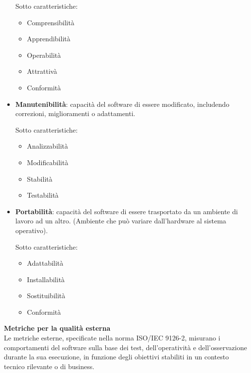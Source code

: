 \begin{itemize}
			Sotto caratteristiche:
			
			\begin{itemize}
			
				\item Comprensibilità
				\item Apprendibilità
				\item Operabilità
				\item Attrattivà
				\item Conformità

			\end{itemize}

		\item \textbf{Manutenibilità}: capacità del software di essere modificato, includendo correzioni, miglioramenti o adattamenti.
		
			Sotto caratteristiche:
		
			\begin{itemize}
			
				\item Analizzabilità
				\item Modificabilità
				\item Stabilità
				\item Testabilità
				
			\end{itemize}

		\item \textbf{Portabilità}: capacità del software di essere trasportato da un ambiente di lavoro ad un altro. (Ambiente che può variare dall'hardware al sistema operativo).
		
			Sotto caratteristiche:
			
			\begin{itemize}
			
				\item Adattabilità
				\item Installabilità
				\item Sostituibilità
				\item Conformità
				
			\end{itemize}
			
		\end{itemize}
		
		\textbf{Metriche per la qualità esterna}\\
		
			Le metriche esterne, specificate nella norma ISO/IEC 9126-2, misurano i comportamenti del software sulla base dei test, dell'operatività e dell'osservazione durante la sua esecuzione, in funzione degli obiettivi stabiliti in un contesto tecnico rilevante o di business.\\
			
